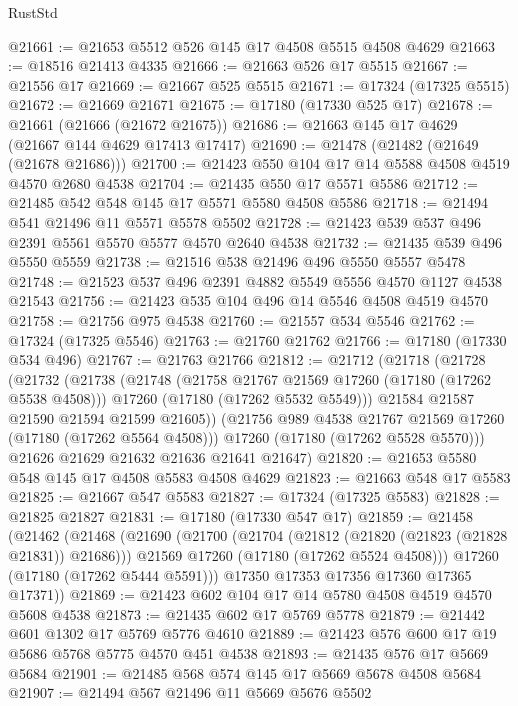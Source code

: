 \begin{lexlean}{RustStd}
\begin{coremodule}
@21661 := @21653 @5512 @526 @145 @17 @4508 @5515 @4508 @4629
@21663 := @18516 @21413 @4335
@21666 := @21663 @526 @17 @5515
@21667 := @21556 @17
@21669 := @21667 @525 @5515
@21671 := @17324 (@17325 @5515)
@21672 := @21669 @21671
@21675 := @17180 (@17330 @525 @17)
@21678 := @21661 (@21666 (@21672 @21675))
@21686 := @21663 @145 @17 @4629 (@21667 @144 @4629 @17413 @17417)
@21690 := @21478 (@21482 (@21649 (@21678 @21686)))
@21700 := @21423 @550 @104 @17 @14 @5588 @4508 @4519 @4570 @2680 @4538
@21704 := @21435 @550 @17 @5571 @5586
@21712 := @21485 @542 @548 @145 @17 @5571 @5580 @4508 @5586
@21718 := @21494 @541 @21496 @11 @5571 @5578 @5502
@21728 := @21423 @539 @537 @496 @2391 @5561 @5570 @5577 @4570 @2640 @4538
@21732 := @21435 @539 @496 @5550 @5559
@21738 := @21516 @538 @21496 @496 @5550 @5557 @5478
@21748 := @21523 @537 @496 @2391 @4882 @5549 @5556 @4570 @1127 @4538 @21543
@21756 := @21423 @535 @104 @496 @14 @5546 @4508 @4519 @4570
@21758 := @21756 @975 @4538
@21760 := @21557 @534 @5546
@21762 := @17324 (@17325 @5546)
@21763 := @21760 @21762
@21766 := @17180 (@17330 @534 @496)
@21767 := @21763 @21766
@21812 := @21712
    (@21718
      (@21728
        (@21732
          (@21738
            (@21748
              (@21758 @21767 @21569 @17260 (@17180 (@17262 @5538 @4508)))
              @17260
              (@17180 (@17262 @5532 @5549)))
            @21584
            @21587
            @21590
            @21594
            @21599
            @21605))
        (@21756 @989 @4538 @21767 @21569 @17260 (@17180 (@17262 @5564 @4508)))
        @17260
        (@17180 (@17262 @5528 @5570)))
      @21626
      @21629
      @21632
      @21636
      @21641
      @21647)
@21820 := @21653 @5580 @548 @145 @17 @4508 @5583 @4508 @4629
@21823 := @21663 @548 @17 @5583
@21825 := @21667 @547 @5583
@21827 := @17324 (@17325 @5583)
@21828 := @21825 @21827
@21831 := @17180 (@17330 @547 @17)
@21859 := @21458
    (@21462
      (@21468
        (@21690
          (@21700
            (@21704 (@21812 (@21820 (@21823 (@21828 @21831)) @21686)))
            @21569
            @17260
            (@17180 (@17262 @5524 @4508)))
          @17260
          (@17180 (@17262 @5444 @5591)))
        @17350
        @17353
        @17356
        @17360
        @17365
        @17371))
@21869 := @21423 @602 @104 @17 @14 @5780 @4508 @4519 @4570 @5608 @4538
@21873 := @21435 @602 @17 @5769 @5778
@21879 := @21442 @601 @1302 @17 @5769 @5776 @4610
@21889 := @21423 @576 @600 @17 @19 @5686 @5768 @5775 @4570 @451 @4538
@21893 := @21435 @576 @17 @5669 @5684
@21901 := @21485 @568 @574 @145 @17 @5669 @5678 @4508 @5684
@21907 := @21494 @567 @21496 @11 @5669 @5676 @5502

\end{coremodule}
\end{lexlean}
